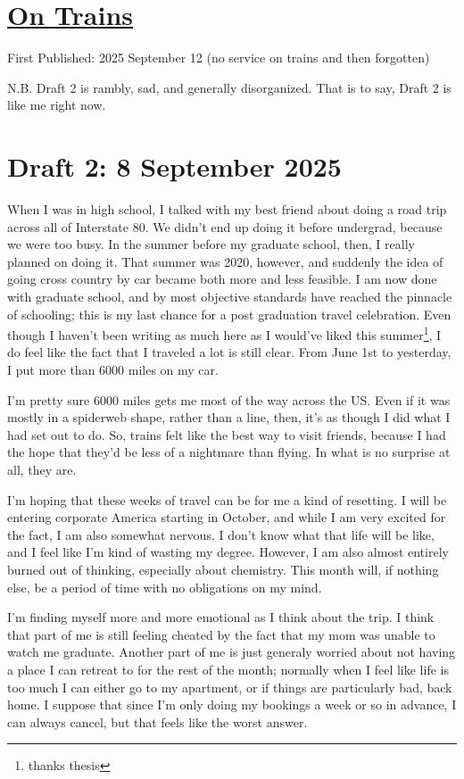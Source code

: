 \documentclass[12pt]{article}
\renewcommand{\,}{\textsuperscript{,}}
\begin{document}
  
\doublespacing  
\section{\href{trains.html}{On Trains}}  
First Published: 2025 September 12 (no service on trains and then forgotten)

N.B. Draft 2 is rambly, sad, and generally disorganized.
That is to say, Draft 2 is like me right now.
\section{Draft 2: 8 September 2025}
When I was in high school, I talked with my best friend about doing a road trip across all of Interstate 80.
We didn't end up doing it before undergrad, because we were too busy.
In the summer before my graduate school, then, I really planned on doing it.
That summer was 2020, however, and suddenly the idea of going cross country by car became both more and less feasible.
I am now done with graduate school, and by most objective standards have reached the pinnacle of schooling; this is my last chance for a post graduation travel celebration.
Even though I haven't been writing as much here as I would've liked this summer\footnote{thanks thesis}, I do feel like the fact that I traveled a lot is still clear.
From June 1st to yesterday, I put more than 6000 miles on my car.

I'm pretty sure 6000 miles gets me most of the way across the US.
Even if it was mostly in a spiderweb shape, rather than a line, then, it's as though I did what I had set out to do.
So, trains felt like the best way to visit friends, because I had the hope that they'd be less of a nightmare than flying.
In what is no surprise at all, they are.

I'm hoping that these weeks of travel can be for me a kind of resetting.
I will be entering corporate America starting in October, and while I am very excited for the fact, I am also somewhat nervous.
I don't know what that life will be like, and I feel like I'm kind of wasting my degree.
However, I am also almost entirely burned out of thinking, especially about chemistry.
This month will, if nothing else, be a period of time with no obligations on my mind.

I'm finding myself more and more emotional as I think about the trip.
I think that part of me is still feeling cheated by the fact that my mom was unable to watch me graduate.
Another part of me is just generaly worried about not having a place I can retreat to for the rest of the month; normally when I feel like life is too much I can either go to my apartment, or if things are particularly bad, back home.
I suppose that since I'm only doing my bookings a week or so in advance, I can always cancel, but that feels like the worst answer.
\end{document}
